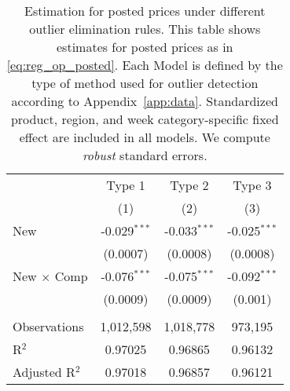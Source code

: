 
\begin{table}[H]
   \centering
   \begin{tabular}{lccc}
      \toprule
                                & Type 1         & Type 2         & Type 3 \\   
                                & (1)            & (2)            & (3)\\  
      \midrule 
      New                       & -0.029$^{***}$ & -0.033$^{***}$ & -0.025$^{***}$\\   
                                & (0.0007)       & (0.0008)       & (0.0008)\\   
      New $\times$ Comp  & -0.076$^{***}$ & -0.075$^{***}$ & -0.092$^{***}$\\   
                                & (0.0009)       & (0.0009)       & (0.001)\\   
       \\
      Observations              & 1,012,598      & 1,018,778      & 973,195\\  
      R$^2$                     & 0.97025        & 0.96865        & 0.96132\\  
      Adjusted R$^2$            & 0.97018        & 0.96857        & 0.96121\\  
      \bottomrule
   \end{tabular}
   
   \par \raggedright 
   \caption{Estimation for posted prices  under different outlier elimination rules. This table shows estimates for posted prices as in \eqref{eq:reg_op_posted}. Each Model is defined by the type of method used for outlier detection according to Appendix~\ref{app:data}. Standardized product, region, and week category-specific fixed effect are included in all models. We compute \textit{robust} standard errors.}
\end{table}

